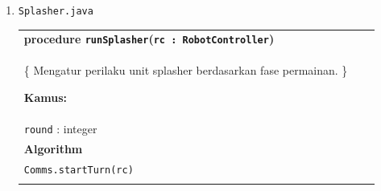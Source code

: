 \documentclass{article}
\newenvironment{pseudobox}
{
\centering
\begin{longtable}{|p{0.94\linewidth}|}
\hline
}
{
\\ \hline
\end{longtable}
\vspace{0.05cm}
}
\begin{document}
\begin{enumerate}[label=\alph*.]
\begin{pseudobox}
\hspace*{3em}endif \\

\hspace*{1.5em}endfor \\

\hspace*{1.5em}\texttt{paintCurrentTileIfNeeded(rc)}

\vspace{0.5em}

\textbf{function \texttt{findNearbyRuin}(\texttt{rc}) $\rightarrow$ MapInfo} \\

\textbf{Algorithm} \\

\hspace*{1.5em}for each \texttt{tile} in \texttt{rc.senseNearbyMapInfos()} do \\

\hspace*{3em}if \texttt{tile.hasRuin()} then \\
\hspace*{4.5em}return \texttt{tile} \\
\hspace*{3em}endif \\

\hspace*{1.5em}endfor \\

\hspace*{1.5em}return null

\end{pseudobox}

\item \texttt{Splasher.java}

\begin{pseudobox}
\textbf{procedure \texttt{runSplasher}(\texttt{rc : RobotController})} \\
\{ Mengatur perilaku unit splasher berdasarkan fase permainan. \}

\textbf{Kamus:} \\
\hspace*{1.5em}\texttt{round} : integer \\

\textbf{Algorithm} \\

\hspace*{1.5em}\texttt{Comms.startTurn(rc)} \\


\end{pseudobox}
\end{enumerate}
\end{document}
